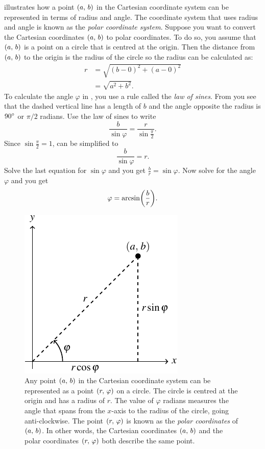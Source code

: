 \documentclass[a4paper,oneside,12pt]{article}
\begin{document}
 illustrates
how a point $\left\lparen{a},\, {b}\right\rparen$ in the Cartesian coordinate system can be
represented in terms of radius and angle.  The coordinate system that
uses radius and angle is known as the \emph{polar coordinate system}.
Suppose you want to convert the Cartesian coordinates $\left\lparen{a},\, {b}\right\rparen$
to polar coordinates.  To do so, you assume that $\left\lparen{a},\, {b}\right\rparen$ is a
point on a circle that is centred at the origin.  Then the distance
from $\left\lparen{a},\, {b}\right\rparen$ to the origin is the radius of the circle so the
radius can be calculated as:
\begin{align*}
r
&=
\sqrt{
  (b - 0)^2 + (a - 0)^2
} \\[4pt]
&=
\sqrt{
  a^2 + b^2
}.
\end{align*}
To calculate the angle $\varphi$ in
, you use a
rule called the \emph{law of sines}.  From
 you see that
the dashed vertical line has a length of $b$ and the angle opposite
the radius is ${90}^{\circ}$ or $\pi / 2$ radians.  Use the law of
sines to write
\begin{equation}
\label{eqn:law_of_sines}
\frac{b}{\sin \varphi}
=
\frac{r}{\sin \frac{\pi}{2}}.
\end{equation}
Since $\sin \frac{\pi}{2} = 1$,  can be
simplified to
\[
\frac{b}{\sin \varphi}
=
r.
\]
Solve the last equation for $\sin \varphi$ and you get
$\frac{b}{r} = \sin \varphi$.  Now solve for the angle $\varphi$ and
you get
\[
\varphi
=
\arcsin\parenthesis*{\frac{b}{r}}.
\]

\begin{figure}[!htbp]
\centering
\includegraphics[scale=1.1]{image/04/polar-cartesian.pdf}
\caption{%
  Any point $\left\lparen{a},\, {b}\right\rparen$ in the Cartesian coordinate system can be
  represented as a point $\left\lparen{r},\, {\varphi}\right\rparen$ on a circle.  The circle
  is centred at the origin and has a radius of $r$.  The value of
  $\varphi$ radians measures the angle that spans from the $x$-axis to
  the radius of the circle, going anti-clockwise.  The point
  $\left\lparen{r},\, {\varphi}\right\rparen$ is known as the \emph{polar coordinates} of
  $\left\lparen{a},\, {b}\right\rparen$.  In other words, the Cartesian coordinates
  $\left\lparen{a},\, {b}\right\rparen$ and the polar coordinates $\left\lparen{r},\, {\varphi}\right\rparen$ both
  describe the same point.
}
\label{fig:convert_from_polar_to_Cartesian_coordinates}
\end{figure}
\end{document}
